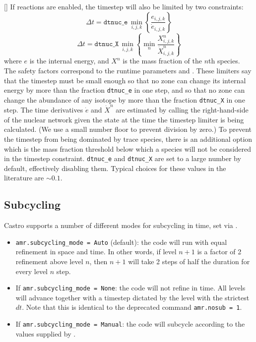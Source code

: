 {[]} If reactions are enabled, the timestep will also
be limited by two constraints:
\begin{equation}
  \Delta t = \mathtt{dtnuc\_e}\, \min_{i,j,k} \left\{\frac{e_{i,j,k}}{\dot{e}_{i,j,k}}\right\}
\end{equation}
\begin{equation}
  \Delta t = \mathtt{dtnuc\_X}\, \min_{i,j,k} \left\{\min_n\frac{X^n_{i,j,k}}{\dot{X}^n_{i,j,k}}\right\}
\end{equation}
where $e$ is the internal energy, and $X^n$ is the mass fraction of
the $n$th species. The safety factors correspond to the runtime parameters
 and . These limiters
say that the timestep must be small enough so that no zone can change
its internal energy by more than the fraction {\tt{dtnuc\_e}} in one
step, and so that no zone can change the abundance of any isotope by
more than the fraction {\tt{dtnuc\_X}} in one step. The time derivatives
$\dot{e}$ and $\dot{X}^n$ are estimated by calling the right-hand-side
of the nuclear network given the state at the time the timestep limiter
is being calculated. (We use a small number floor to prevent division by zero.)
To prevent the timestep from being dominated by trace species, there is
an additional option  which is the
mass fraction threshold below which a species will not be considered in
the timestep constraint. {\tt{dtnuc\_e}} and {\tt{dtnuc\_X}} are set to
a large number by default, effectively disabling them. Typical choices
for these values in the literature are $\sim 0.1$.



\subsection{Subcycling}
Castro supports a number of different modes for subcycling in time,
set via .

\begin{itemize}
\item {\tt amr.subcycling\_mode = Auto} (default): the code will run
  with equal refinement in space and time. In other words, if level
  $n+1$ is a factor of 2 refinement above level $n$, then $n+1$ will
  take 2 steps of half the duration for every level $n$ step.

\item If {\tt amr.subcycling\_mode = None}: the code will not refine
  in time. All levels will advance together with a timestep dictated
  by the level with the strictest $dt$. Note that this is identical to
  the deprecated command {\tt amr.nosub = 1}.

\item If {\tt amr.subcycling\_mode = Manual}: the code will subcycle
  according to the values supplied by .

\end{itemize}

